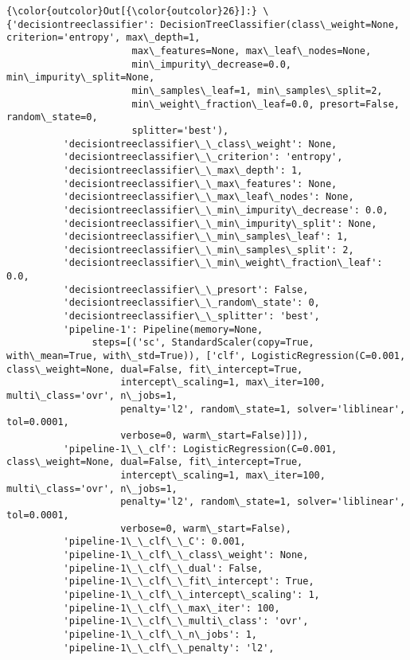 \documentclass[11pt]{article}
\begin{document}
\begin{Verbatim}[commandchars=\\\{\}]
{\color{outcolor}Out[{\color{outcolor}26}]:} \{'decisiontreeclassifier': DecisionTreeClassifier(class\_weight=None, criterion='entropy', max\_depth=1,
                      max\_features=None, max\_leaf\_nodes=None,
                      min\_impurity\_decrease=0.0, min\_impurity\_split=None,
                      min\_samples\_leaf=1, min\_samples\_split=2,
                      min\_weight\_fraction\_leaf=0.0, presort=False, random\_state=0,
                      splitter='best'),
          'decisiontreeclassifier\_\_class\_weight': None,
          'decisiontreeclassifier\_\_criterion': 'entropy',
          'decisiontreeclassifier\_\_max\_depth': 1,
          'decisiontreeclassifier\_\_max\_features': None,
          'decisiontreeclassifier\_\_max\_leaf\_nodes': None,
          'decisiontreeclassifier\_\_min\_impurity\_decrease': 0.0,
          'decisiontreeclassifier\_\_min\_impurity\_split': None,
          'decisiontreeclassifier\_\_min\_samples\_leaf': 1,
          'decisiontreeclassifier\_\_min\_samples\_split': 2,
          'decisiontreeclassifier\_\_min\_weight\_fraction\_leaf': 0.0,
          'decisiontreeclassifier\_\_presort': False,
          'decisiontreeclassifier\_\_random\_state': 0,
          'decisiontreeclassifier\_\_splitter': 'best',
          'pipeline-1': Pipeline(memory=None,
               steps=[('sc', StandardScaler(copy=True, with\_mean=True, with\_std=True)), ['clf', LogisticRegression(C=0.001, class\_weight=None, dual=False, fit\_intercept=True,
                    intercept\_scaling=1, max\_iter=100, multi\_class='ovr', n\_jobs=1,
                    penalty='l2', random\_state=1, solver='liblinear', tol=0.0001,
                    verbose=0, warm\_start=False)]]),
          'pipeline-1\_\_clf': LogisticRegression(C=0.001, class\_weight=None, dual=False, fit\_intercept=True,
                    intercept\_scaling=1, max\_iter=100, multi\_class='ovr', n\_jobs=1,
                    penalty='l2', random\_state=1, solver='liblinear', tol=0.0001,
                    verbose=0, warm\_start=False),
          'pipeline-1\_\_clf\_\_C': 0.001,
          'pipeline-1\_\_clf\_\_class\_weight': None,
          'pipeline-1\_\_clf\_\_dual': False,
          'pipeline-1\_\_clf\_\_fit\_intercept': True,
          'pipeline-1\_\_clf\_\_intercept\_scaling': 1,
          'pipeline-1\_\_clf\_\_max\_iter': 100,
          'pipeline-1\_\_clf\_\_multi\_class': 'ovr',
          'pipeline-1\_\_clf\_\_n\_jobs': 1,
          'pipeline-1\_\_clf\_\_penalty': 'l2',

\end{Verbatim}
\end{document}
